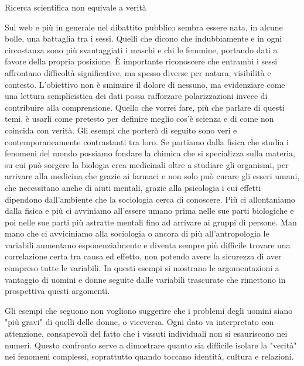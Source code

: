 \documentclass[12pt]{book} %
\begin{document}
\begin{mdframed}[linewidth=1pt]
Ricerca scientifica non equivale a verità

Sul web e più in generale nel dibattito pubblico sembra essere nata, in alcune bolle, una battaglia tra i sessi. Quelli che dicono che indubbiamente e in ogni circostanza sono più svantaggiati i maschi e chi le femmine, portando dati a favore della propria posizione.
È importante riconoscere che entrambi i sessi affrontano difficoltà significative, ma spesso diverse per natura, visibilità e contesto. L'obiettivo non è sminuire il dolore di nessuno, ma evidenziare come una lettura semplicistica dei dati possa rafforzare polarizzazioni invece di contribuire alla comprensione.
Quello che vorrei fare, più che parlare di questi temi, è usarli come pretesto per definire meglio cos'è scienza e di come non coincida con verità. Gli esempi che porterò di seguito sono veri e contemporaneamente contrastanti tra loro. 
Se partiamo dalla fisica che studia i fenomeni del mondo possiamo fondare la chimica che si specializza sulla materia, su cui può sorgere la biologia crea medicinali oltre a studiare gli organismi, per arrivare alla medicina che grazie ai farmaci e non solo può curare gli esseri umani, che necessitano anche di aiuti mentali, grazie alla psicologia i cui effetti dipendono dall'ambiente che la sociologia cerca di conoscere. Più ci allontaniamo dalla fisica e più ci avviniamo all'essere umano prima nelle sue parti biologiche e poi nelle sue parti più astratte mentali fino ad arrivare ai gruppi di persone. Man mano che ci avviciniamo alla sociologia o ancora di più all'antropologia le variabili aumentano esponenzialmente e diventa sempre più difficile trovare una correlazione certa tra causa ed effetto, non potendo avere la sicurezza di aver compreso tutte le variabili. 
In questi esempi si mostrano le argomentazioni a vantaggio di uomini e donne seguite dalle variabili trascurate che rimettono in prospettiva questi argomenti.

Gli esempi che seguono non vogliono suggerire che i problemi degli uomini siano "più gravi" di quelli delle donne, o viceversa. Ogni dato va interpretato con attenzione, consapevoli del fatto che i vissuti individuali non si esauriscono nei numeri. Questo confronto serve a dimostrare quanto sia difficile isolare la "verità" nei fenomeni complessi, soprattutto quando toccano identità, cultura e relazioni.


\end{mdframed}
\end{document}
